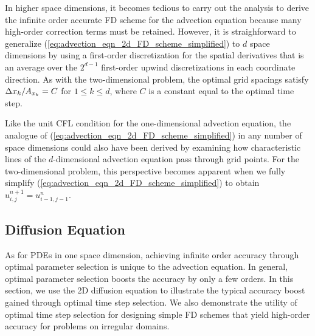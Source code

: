 \documentclass[oneeqnum,onefignum,onetabnum,onethmnum]{siamltex}
\begin{document}
In higher space dimensions, it becomes tedious to carry out the analysis 
to derive the infinite order accurate FD scheme for the advection equation
because many high-order correction terms must be retained.  However, it is 
straighforward to generalize 
(\ref{eq:advection_eqn_2d_FD_scheme_simplified}) to $d$ space dimensions by 
using a first-order discretization for the spatial derivatives that is an 
average over the $2^{d-1}$ first-order upwind discretizations in each 
coordinate direction.   As with the two-dimensional problem, the optimal 
grid spacings satisfy $\Delta x_k/A_{x_k} = C$ for $1 \le k \le d$, where $C$ is 
a constant equal to the optimal time step. 

Like the unit CFL condition for the one-dimensional advection equation, the 
analogue of (\ref{eq:advection_eqn_2d_FD_scheme_simplified}) in any number
of space dimensions could also have been derived by examining how 
characteristic lines of the $d$-dimensional advection equation pass 
through grid points.  For the two-dimensional problem, this perspective 
becomes apparent when we fully simplify 
(\ref{eq:advection_eqn_2d_FD_scheme_simplified}) to obtain
$u^{n+1}_{i,j} = u^{n}_{i-1,j-1}$.



\subsection{Diffusion Equation}
As for PDEs in one space dimension, achieving infinite order accuracy 
through optimal parameter selection is unique to the advection equation.
In general, optimal parameter selection boosts the accuracy by only a few 
orders.  In this section, we use the 2D diffusion equation to illustrate the 
typical accuracy boost gained through optimal time step selection.  We also 
demonstrate the utility of optimal time step selection for designing simple 
FD schemes that yield high-order accuracy for problems on irregular domains.
\end{document}
